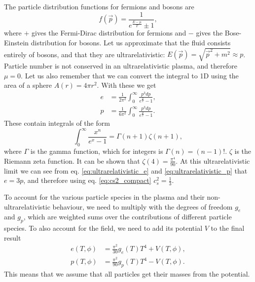 The particle distribution functions for fermions and bosons are
\cite[eq. 4.6]{lecture_notes}
\begin{equation}
f(\vec{p}) = \frac{1}{e^\frac{E-\mu}{T} \pm 1},
\end{equation}
where $+$ gives the Fermi-Dirac distribution for fermions and $-$ gives the Bose-Einstein distribution for bosons.
Let us approximate that the fluid consists entirely of bosons,
and that they are ultrarelativistic: $E(\vec{p}) = \sqrt{\vec{p}^2 + m^2} \approx p$.
Particle number is not conserved in an ultrarelativistic plasma, and therefore $\mu = 0$.
Let us also remember that we can convert the integral to 1D using the area of a sphere $A(r) = 4\pi r^2$.
With these we get
\begin{align}
e &= \frac{1}{2 \pi^2} \int_0^\infty \frac{p^3 dp}{e^\frac{p}{T} - 1},
\label{eq:ultrarelativistic_e} \\
p &= \frac{1}{6 \pi^2} \int_0^\infty \frac{p^3 dp}{e^\frac{p}{T} - 1}.
\label{eq:ultrarelativistic_p}
\end{align}
These contain integrals of the form
\cite[eq. B.36]{schroeder_thermal_2000}
\begin{equation}
\int_0^\infty \frac{x^n}{e^x - 1} = \Gamma(n+1) \zeta(n+1),
\end{equation}
where $\Gamma$ is the
gamma function, which for integers is $\Gamma(n) = (n-1)!$.
$\zeta$ is the
Riemann zeta function.
It can be shown that $\zeta(4) = \frac{\pi^4}{90}$.
\cite[prob. B.19]{schroeder_thermal_2000}
At this ultrarelativistic limit we can see from eq. \eqref{eq:ultrarelativistic_e} and \eqref{eq:ultrarelativistic_p} that $e = 3p$, and therefore using eq. \eqref{eq:cs2_compact} $c_s^2 = \frac{1}{3}$.

To account for the various particle species in the plasma and their non-ultrarelativistic behaviour,
we need to multiply with the degrees of freedom $g_e$ and $g_p$,
which are weighted sums over the contributions of different particle species.
To also account for the field, we need to add its potential $V$ to the final result
\cite[eq. S12]{borsanyi_lattice_2016}
\begin{align}
e(T,\phi) &= \frac{\pi^2}{30} g_e(T) T^4 + V(T,\phi),
\label{eq:e_general} \\
p(T,\phi) &= \frac{\pi^2}{90} g_p(T) T^4 - V(T,\phi).
\label{eq:p_general}
\end{align}
This means that we assume that all particles get their masses from the potential.

